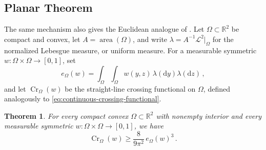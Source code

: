 \documentclass[reqno, 11pt]{amsart}
\newtheorem{theorem}{Theorem}
\theoremstyle{definition}
\newcommand{\dd}{\mathrm{d}}
\begin{document}
\subsection{Planar Theorem}\label{subsec:main-planar}
The same mechanism also gives the Euclidean analogue of .  Let \(\Omega\subset{\mathbb R}^2\) be compact and convex, let \(A=\operatorname{area}(\Omega)\), and write \(\lambda=A^{-1}\mathcal L^2|_\Omega\) for the normalized Lebesgue measure, or uniform measure.  For a measurable symmetric \(w:\Omega\times\Omega\to[0,1]\), set
\[
        e_\Omega(w)=\int_{\Omega}\int_{\Omega}w(y,z)\,\lambda(\dd y)\lambda(\dd z)\,,
\]
and let \(\operatorname{Cr}_\Omega(w)\) be the straight-line crossing functional on \(\Omega\), defined analogously to \eqref{eq:continuous-crossing-functional}.

\begin{theorem}\label{thm:continuous-planar-crossing-main}
For every compact convex \(\Omega\subset{\mathbb R}^2\) with nonempty interior and every measurable symmetric \(w:\Omega\times\Omega\to[0,1]\), we have
\begin{equation}\label{eq:continuous-planar-crossing-main}
        \operatorname{Cr}_\Omega(w)
        \ge
        \frac{8}{9\pi^2}\,e_\Omega(w)^3\,.
\end{equation}
\end{theorem}
\end{document}
